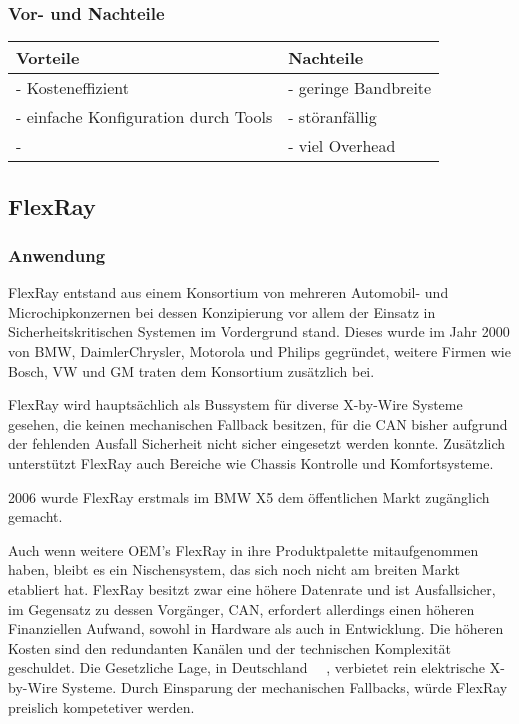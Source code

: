     \subsubsection{Vor- und Nachteile}

    \begin{center}
        \begin{tabular}{p{5.5cm} p{5.5cm}}
            \hline
            Vorteile & Nachteile\\
            \hline
            \hline - Kosteneffizient & - geringe Bandbreite\\
            \hline - einfache Konfiguration durch Tools & - störanfällig\\
            \hline - & - viel Overhead\\
            \hline
        \end{tabular}            
    \end{center}

\subsection{FlexRay}
    \subsubsection{Anwendung}
    FlexRay entstand aus einem Konsortium von mehreren Automobil- und Microchipkonzernen bei
    dessen Konzipierung vor allem der Einsatz in Sicherheitskritischen Systemen im Vordergrund 
    stand. Dieses wurde im Jahr 2000 von BMW, DaimlerChrysler, Motorola und Philips gegründet,
    weitere Firmen wie Bosch, VW und GM traten dem Konsortium zusätzlich bei.

    FlexRay wird hauptsächlich als Bussystem für diverse X-by-Wire Systeme gesehen, die keinen 
    mechanischen Fallback besitzen, für die CAN bisher aufgrund der fehlenden Ausfall Sicherheit 
    nicht sicher eingesetzt werden konnte. Zusätzlich unterstützt FlexRay auch Bereiche wie Chassis
    Kontrolle und Komfortsysteme. 

    2006 wurde FlexRay erstmals im BMW X5 dem öffentlichen Markt zugänglich gemacht.
    ~\cite{LA_Bosch_6te_auflage}

    Auch wenn weitere OEM’s FlexRay in ihre Produktpalette mitaufgenommen haben, bleibt es
    ein Nischensystem, das sich noch nicht am breiten Markt etabliert hat. FlexRay besitzt zwar eine
    höhere Datenrate und ist Ausfallsicher, im Gegensatz zu dessen Vorgänger, CAN, erfordert 
    allerdings einen höheren Finanziellen Aufwand, sowohl in Hardware als auch in Entwicklung.
    Die höheren Kosten sind den redundanten Kanälen und der technischen Komplexität geschuldet.
    Die Gesetzliche Lage, in Deutschland~\cite{LA_StVZO38}~\cite{LA_StVZO41}
    , verbietet rein elektrische X-by-Wire Systeme. Durch 
    Einsparung der mechanischen Fallbacks, würde FlexRay preislich kompetetiver werden.
    ~\cite{LA_FR1}
    ~\cite{LA_FR2}
    ~\cite{LA_FR3}
    ~\cite{LA_FR4}
    
